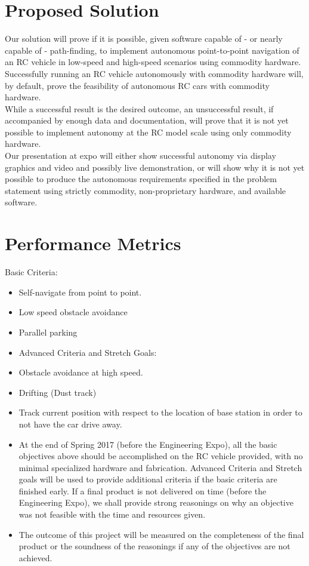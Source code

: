 \documentclass[draftclsnofoot,onecolumn,10pt]{IEEEtran}
\begin{document}
\section{Proposed Solution}
Our solution will prove if it is possible, given software capable of - or nearly
capable of - path-finding, to implement autonomous point-to-point navigation of
an RC vehicle in low-speed and high-speed scenarios using commodity hardware.\\

Successfully running an RC vehicle autonomously with commodity hardware will, by
default, prove the feasibility of autonomous RC cars with commodity hardware.\\
While a successful result is the desired outcome, an unsuccessful result, if accompanied by enough data and documentation, will prove that it is not yet possible to implement autonomy at the RC model scale using only commodity hardware.\\

Our presentation at expo will either show successful autonomy via display graphics and video and possibly live demonstration, or will show why it is not yet possible to produce the autonomous requirements specified in the problem statement using strictly commodity, non-proprietary hardware, and available software.\\

\section{Performance Metrics}
Basic Criteria:
\begin{itemize}
	\item Self-navigate from point to point.
	\item Low speed obstacle avoidance
	\item Parallel parking
	\item Advanced Criteria and Stretch Goals:
	\item Obstacle avoidance at high speed.
	\item Drifting (Dust track) 
	\item Track current position with respect to the location of base station in order to not have the car drive away. 
	\item At the end of Spring 2017 (before the Engineering Expo), all the basic objectives above should be accomplished on the RC vehicle provided, with no minimal specialized hardware and fabrication. Advanced Criteria and Stretch goals will be used to provide additional criteria if the basic criteria are finished early. If a final product is not delivered on time (before the Engineering Expo), we shall provide strong reasonings on why an objective was not feasible with the time and resources given. 
	\item The outcome of this project will be measured on the completeness of the final product or the soundness of the reasonings if any of the objectives are not achieved. 
\end{itemize}
\end{document}

